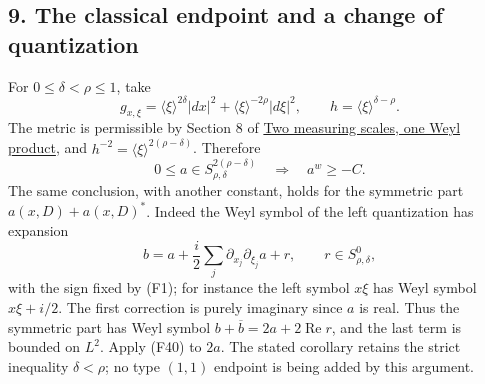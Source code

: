\documentclass[
  11pt,
]{article}
\makeatletter
\let\ReaderOriginalAnchorStart\hyper@anchorstart
\let\ReaderOriginalAnchorEnd\hyper@anchorend
\let\ReaderPendingAliases\@empty
\def\ReaderArmAliases#1{\gdef\ReaderPendingAliases{#1}}
\def\hyper@anchorstart#1{\ReaderIfNativeAnchorTF{#1}{\ReaderPendingAliases\global\let\ReaderPendingAliases\@empty}{}\ReaderOriginalAnchorStart{#1}}
\makeatother
\begin{document}
\ReaderArmAliases{\ReaderOriginalAnchorStart{AN03-SFP-009}\ReaderOriginalAnchorEnd\begingroup\expandafter\def\csname @currentHref\endcsname{AN03-SFP-009}\label{AN03-SFP-009}\endgroup\ReaderOriginalAnchorStart{an03-sfp-009-the-classical-endpoint-and-a-change-of-quantization}\ReaderOriginalAnchorEnd\begingroup\expandafter\def\csname @currentHref\endcsname{an03-sfp-009-the-classical-endpoint-and-a-change-of-quantization}\label{an03-sfp-009-the-classical-endpoint-and-a-change-of-quantization}\endgroup\ReaderOriginalAnchorStart{9-the-classical-endpoint-and-a-change-of-quantization}\ReaderOriginalAnchorEnd\begingroup\expandafter\def\csname @currentHref\endcsname{9-the-classical-endpoint-and-a-change-of-quantization}\label{9-the-classical-endpoint-and-a-change-of-quantization}\endgroup\ReaderOriginalAnchorStart{the-classical-endpoint-and-a-change-of-quantization}\ReaderOriginalAnchorEnd}
\subsection{9. The classical endpoint and a change of
quantization}\label{the-classical-endpoint-and-a-change-of-quantization}

For \(0\leq\delta<\rho\leq1\), take \[
g_{x,\xi}=\langle\xi\rangle^{2\delta}|dx|^2+
                  \langle\xi\rangle^{-2\rho}|d\xi|^2,
\qquad h=\langle\xi\rangle^{\delta-\rho}.
\tag{F39}
\] The metric is permissible by Section 8 of
\href{weyl-metric-products.pdf}{Two measuring scales, one Weyl product},
and \(h^{-2}=\langle\xi\rangle^{2(\rho-\delta)}\). Therefore \[
0\leq a\in S_{\rho,\delta}^{2(\rho-\delta)}
\quad\Longrightarrow\quad a^w\geq-C.
\tag{F40}
\] The same conclusion, with another constant, holds for the symmetric
part \(a(x,D)+a(x,D)^*\). Indeed the Weyl symbol of the left
quantization has expansion \[
b=a+\frac{i}{2}\sum_j\partial_{x_j}\partial_{\xi_j}a+r,
\qquad r\in S_{\rho,\delta}^{0},
\tag{F41}
\] with the sign fixed by (F1); for instance the left symbol \(x\xi\)
has Weyl symbol \(x\xi+i/2\). The first correction is purely imaginary
since \(a\) is real. Thus the symmetric part has Weyl symbol
\(b+\overline b=2a+2\operatorname{Re}r\), and the last term is bounded
on \(L^2\). Apply (F40) to \(2a\). The stated corollary retains the
strict inequality \(\delta<\rho\); no type \((1,1)\) endpoint is being
added by this argument.
\end{document}
